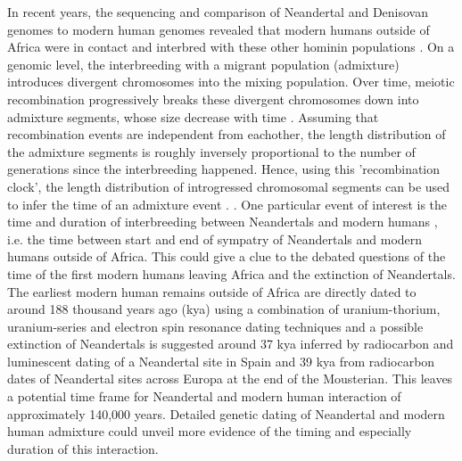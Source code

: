 \documentclass[]{article}
\begin{document}
In recent years, the sequencing and comparison of Neandertal \citep{green_draft_2010,prufer_complete_2013,prufer_high-coverage_2017, mafessoni_high_coverage_2020} and Denisovan genomes \citep{reich_genetic_2010, meyer_high-coverage_2012} to modern human genomes revealed that modern humans outside of Africa were in contact and interbred with these other hominin populations \citep{vernot_resurrecting_2014,fu_genome_2014,fu_early_2015,sankararaman_genomic_2014,sankararaman_combined_2016,vernot_excavating_2016,malaspinas_genomic_2016}. On a genomic level, the interbreeding with a migrant population (admixture) introduces divergent chromosomes into the mixing population. Over time, meiotic recombination progressively breaks these divergent chromosomes down into admixture segments, whose size decrease with time \citep{falush_inference_2003}. Assuming that recombination events are independent from eachother, the length distribution of the admixture segments is roughly inversely proportional to the number of generations since the interbreeding happened. Hence, using this 'recombination clock', the length distribution of introgressed chromosomal segments can be used to infer the time of an
admixture event \citep{moorjani_history_2011,pugach_dating_2011,sankararaman_date_2012,loh_inferring_2013,sankararaman_combined_2016,pugach_gateway_2018,jacobs_multiple_2019,hellenthal_genetic_2014}. \citep{pool_inference_2009,moorjani_history_2011,gravel_population_2012,liang_lengths_2014}. One particular event of interest is the time and duration of interbreeding between Neandertals and modern humans , i.e. the time between start and end of sympatry of Neandertals and modern humans outside of Africa. This could give a clue to the debated questions of the time of the first modern humans leaving Africa and the extinction of Neandertals. The earliest modern human remains outside of Africa are directly dated to around 188 thousand years ago (kya)  using a combination of uranium-thorium, uranium-series and electron spin resonance dating techniques  \citep{stringer_when_2018,hershkovitz_earliest_2018} and a possible extinction of Neandertals is suggested around 37 kya inferred by radiocarbon and luminescent dating of a Neandertal site in Spain \citep{zilhao_precise_2017} and 39 kya from radiocarbon dates of Neandertal sites across Europa \citep{higham_timing_2014} at the end of the Mousterian. This leaves a potential time frame for Neandertal and modern human interaction of approximately 140,000 years. Detailed genetic dating of Neandertal and modern human admixture could unveil more evidence of the timing and especially duration of this interaction. 
\end{document}
